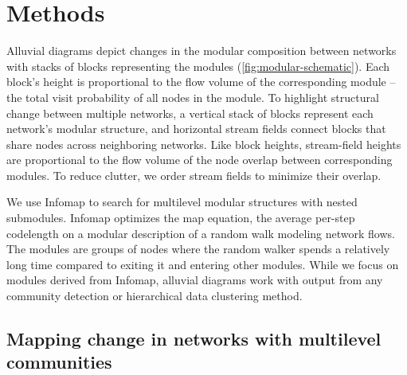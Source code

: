 \documentclass[aps,rmp,floats,floatfix,twocolumn,superscriptaddress,final]{revtex4-2}
\begin{document}
\section*{Methods}

Alluvial diagrams depict changes in the modular composition between networks with stacks of blocks representing the modules (\cref{fig:modular-schematic}).
Each block's height is proportional to the flow volume of the corresponding module -- the total visit probability of all nodes in the module.
To highlight structural change between multiple networks, a vertical stack of blocks represent each network's modular structure, and horizontal stream fields connect blocks that share nodes across neighboring networks.
Like block heights, stream-field heights are proportional to the flow volume of the node overlap between corresponding modules.
To reduce clutter, we order stream fields to minimize their overlap.

We use Infomap to search for multilevel modular structures with nested submodules.\cite{mapequation2022software,rosvall2011multilevel}
Infomap optimizes the map equation, the average per-step codelength on a modular description of a random walk modeling network flows.\cite{rosvall2008maps}
The modules are groups of nodes where the random walker spends a relatively long time compared to exiting it and entering other modules.
While we focus on modules derived from Infomap, alluvial diagrams work with output from any community detection or hierarchical data clustering method.

\subsection*{Mapping change in networks with multilevel communities}
\end{document}
